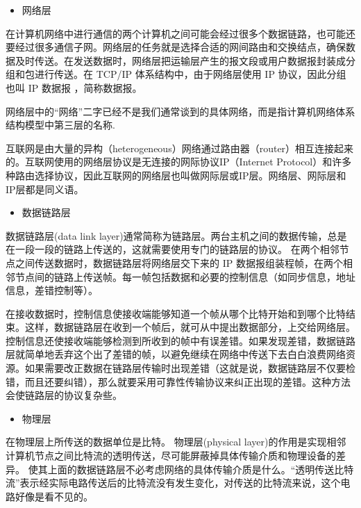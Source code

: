 \begin{itemize}
    \item[3.] 网络层
\end{itemize}

在计算机网络中进行通信的两个计算机之间可能会经过很多个数据链路，也可能还要经过很多通信子网。网络层的任务就是选择合适的网间路由和交换结点，确保数据及时传送。在发送数据时，网络层把运输层产生的报文段或用户数据报封装成分组和包进行传送。在 TCP/IP 体系结构中，由于网络层使用 IP 协议，因此分组也叫 IP 数据报 ，简称数据报。

网络层中的“网络”二字已经不是我们通常谈到的具体网络，而是指计算机网络体系结构模型中第三层的名称.

互联网是由大量的异构（heterogeneous）网络通过路由器（router）相互连接起来的。互联网使用的网络层协议是无连接的网际协议IP（Internet Protocol）和许多种路由选择协议，因此互联网的网络层也叫做网际层或IP层。网络层、网际层和IP层都是同义语。

\begin{itemize}
    \item[4.] 数据链路层
\end{itemize}

数据链路层(data link layer)通常简称为链路层。两台主机之间的数据传输，总是在一段一段的链路上传送的，这就需要使用专门的链路层的协议。 在两个相邻节点之间传送数据时，数据链路层将网络层交下来的 IP 数据报组装程帧，在两个相邻节点间的链路上传送帧。每一帧包括数据和必要的控制信息（如同步信息，地址信息，差错控制等）。

在接收数据时，控制信息使接收端能够知道一个帧从哪个比特开始和到哪个比特结束。这样，数据链路层在收到一个帧后，就可从中提出数据部分，上交给网络层。 控制信息还使接收端能够检测到所收到的帧中有误差错。如果发现差错，数据链路层就简单地丢弃这个出了差错的帧，以避免继续在网络中传送下去白白浪费网络资源。如果需要改正数据在链路层传输时出现差错（这就是说，数据链路层不仅要检错，而且还要纠错），那么就要采用可靠性传输协议来纠正出现的差错。这种方法会使链路层的协议复杂些。

\begin{itemize}
    \item[5.] 物理层
\end{itemize}

在物理层上所传送的数据单位是比特。 物理层(physical layer)的作用是实现相邻计算机节点之间比特流的透明传送，尽可能屏蔽掉具体传输介质和物理设备的差异。 使其上面的数据链路层不必考虑网络的具体传输介质是什么。“透明传送比特流”表示经实际电路传送后的比特流没有发生变化，对传送的比特流来说，这个电路好像是看不见的。

